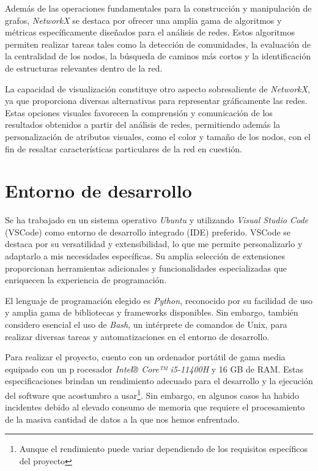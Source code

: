 Además de las operaciones fundamentales para la construcción y manipulación de grafos, \emph{NetworkX} se
destaca por ofrecer una amplia gama de algoritmos y métricas específicamente diseñados para el análisis de redes. 
Estos algoritmos permiten realizar tareas tales como la detección de comunidades, la evaluación de la centralidad de 
los nodos, la búsqueda de caminos más cortos y la identificación de estructuras relevantes dentro de la red.

La capacidad de visualización constituye otro aspecto sobresaliente de \emph{NetworkX}, ya que proporciona 
diversas alternativas para representar gráficamente las redes. Estas opciones visuales favorecen la comprensión 
y comunicación de los resultados obtenidos a partir del análisis de redes, permitiendo además la personalización 
de atributos visuales, como el color y tamaño de los nodos, con el fin de resaltar características particulares 
de la red en cuestión.

\section{Entorno de desarrollo}

Se ha trabajado en un sistema operativo \textit{Ubuntu} y utilizando \textit{Visual Studio Code} 
(VSCode) como entorno de desarrollo integrado (IDE) preferido. VSCode se destaca por 
su versatilidad y extensibilidad, lo que me permite personalizarlo y adaptarlo a mis necesidades 
específicas. Su amplia selección de extensiones proporcionan herramientas adicionales y funcionalidades 
especializadas que enriquecen la experiencia de programación.

El lenguaje de programación elegido es \textit{Python}, reconocido por su facilidad de uso y amplia 
gama de bibliotecas y frameworks disponibles. Sin embargo, también considero esencial el uso de \textit{Bash}, 
un intérprete de comandos de Unix, para realizar diversas tareas y automatizaciones en el entorno 
de desarrollo.

Para realizar el proyecto, cuento con un ordenador portátil de gama media equipado con un p
rocesador \textit{Intel® Core™ i5-11400H} y 16 GB de RAM. Estas especificaciones brindan un rendimiento 
adecuado para el desarrollo y la ejecución del software que acostumbro a usar\footnote{ Aunque el 
rendimiento puede variar dependiendo de los requisitos específicos del proyecto}. Sin embargo, en 
algunos casos ha habido incidentes debido al elevado consumo de memoria que requiere el procesamiento 
de la masiva cantidad de datos a la que nos hemos enfrentado.

